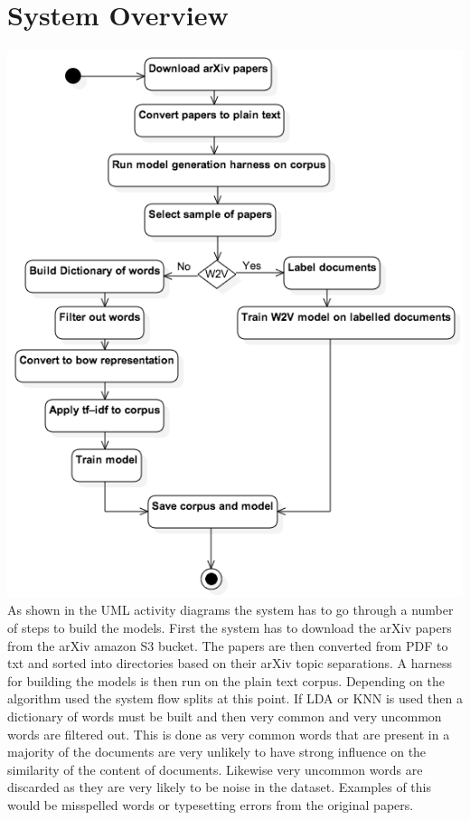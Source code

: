 \section{System Overview}
\includegraphics[width=15cm]{Figures/ArchictectureBuildingUML.png}
As shown in the UML activity diagrams the system has to go through a number of steps to build the models.
First the system has to download the arXiv papers from the arXiv amazon S3 bucket.
The papers are then converted from PDF to txt and sorted into directories based on their arXiv topic separations.
A harness for building the models is then run on the plain text corpus.
Depending on the algorithm used the system flow splits at this point.
If LDA or KNN is used then a dictionary of words must be built and then very common and very uncommon words are filtered out.
This is done as very common words that are present in a majority of the documents are very unlikely to have strong influence on the similarity of the content of documents.
Likewise very uncommon words are discarded as they are very likely to be noise in the dataset. Examples of this would be misspelled words or typesetting errors from the original papers.  

